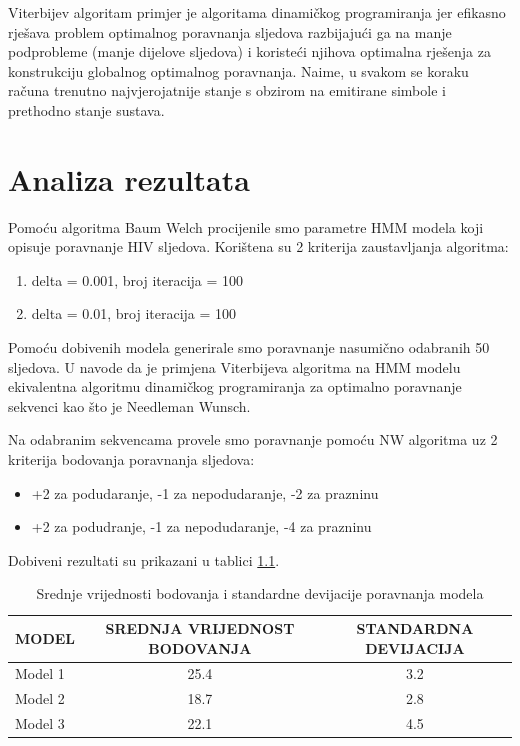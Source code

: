 \documentclass[times, utf8, seminar, numeric]{fer}
\begin{document}
 Viterbijev algoritam primjer je algoritama dinamičkog programiranja jer efikasno rješava problem optimalnog poravnanja sljedova razbijajući ga na manje podprobleme (manje dijelove sljedova) i koristeći njihova optimalna rješenja za konstrukciju globalnog optimalnog poravnanja. Naime, u svakom se koraku računa trenutno najvjerojatnije stanje s obzirom na emitirane simbole i prethodno stanje sustava.


\chapter{Analiza rezultata}
Pomoću algoritma Baum Welch procijenile smo parametre HMM modela koji opisuje poravnanje HIV sljedova. Korištena su 2 kriterija zaustavljanja algoritma: \begin{enumerate}
	\item delta = 0.001, broj iteracija = 100
	\item delta = 0.01, broj iteracija = 100
\end{enumerate}
Pomoću dobivenih modela generirale smo poravnanje nasumično odabranih 50 sljedova. U \cite{durbin1998biological} navode da je primjena Viterbijeva algoritma na HMM modelu ekivalentna algoritmu dinamičkog programiranja za optimalno poravnanje sekvenci kao što je Needleman Wunsch. 

Na odabranim sekvencama provele smo poravnanje pomoću NW algoritma uz 2 kriterija bodovanja poravnanja sljedova:
\begin{itemize}
	\item +2 za podudaranje, -1 za nepodudaranje, -2 za prazninu
	\item +2 za podudranje, -1 za nepodudaranje, -4 za prazninu
\end{itemize} 

Dobiveni rezultati su prikazani u tablici \ref{tab:rezultati}.

\begin{table}[ht]
	\centering
	\begin{tabular}{lcc}
		\toprule
		\textbf{MODEL} & \textbf{SREDNJA VRIJEDNOST BODOVANJA} & \textbf{STANDARDNA DEVIJACIJA} \\
		\midrule
		Model 1 & 25.4 & 3.2 \\
		Model 2 & 18.7 & 2.8 \\
		Model 3 & 22.1 & 4.5 \\
		\bottomrule
	\end{tabular}
	\caption{Srednje vrijednosti bodovanja i standardne devijacije poravnanja modela}
	\label{tab:rezultati}
\end{table}
\end{document}
